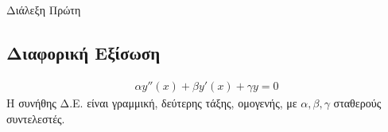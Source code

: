 \documentclass[12pt]{extarticle}
\begin{document}
\tableofcontents
\newpage
\chapter{}{Διάλεξη Πρώτη}
\section{Διαφορική Εξίσωση}
\begin{equation*}
    \begin{aligned}
        \alpha y''(x) + \beta y' (x)+ \gamma y = 0
    \end{aligned}
\end{equation*}
Η συνήθης Δ.Ε. είναι γραμμική, δεύτερης τάξης, ομογενής, με
\begin{math}
    α,β,γ
\end{math}
σταθερούς συντελεστές.
\end{document}
